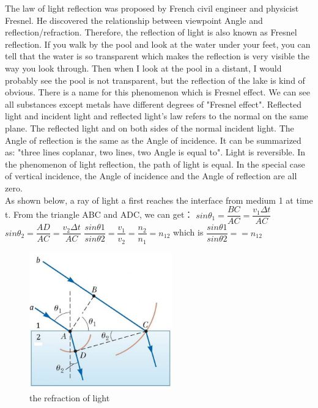 \documentclass[a4paper]{article}
\begin{document}
The law of light reflection was proposed by French civil engineer and physicist Fresnel. He discovered the relationship between viewpoint Angle and reflection/refraction. Therefore, the reflection of light is also known as Fresnel reflection. If you walk by the pool and look at the water under your feet, you can tell that the water is so transparent which makes the reflection is very visible the way you look through. Then when I look at the pool in a distant, I would probably see the pool is not transparent, but the reflection of the lake is kind of obvious. There is a name for this phenomenon which is Fresnel effect. We can see all substances except metals have different degrees of "Fresnel effect". Reflected light and incident light and reflected light's law refers to the normal on the same plane. The reflected light and on both sides of the normal incident light. The Angle of reflection is the same as the Angle of incidence. It can be summarized as: "three lines coplanar, two lines, two Angle is equal to". Light is reversible. In the phenomenon of light reflection, the path of light is equal. In the special case of vertical incidence, the Angle of incidence and the Angle of reflection are all zero.
\\

As shown below, a ray of light a first reaches the interface from medium 1 at time t.
From the triangle ABC and ADC, we can get：
$sin\theta _{1}= \dfrac{BC}{AC}= \dfrac{v_{1}\Delta t}{AC}$
$sin\theta _{2}= \dfrac{AD}{AC}= \dfrac{v_{2}\Delta t}{AC}$
$\dfrac{sin\theta 1}{sin\theta 2}= \dfrac{v_{1}}{v_{2}}= \dfrac{n_{2}}{n_{1}}= n_{12}$
which is
$\dfrac{sin\theta 1}{sin\theta 2}= = n_{12}$
\cite{Tarja Volotinen}
\\

\begin{figure}[h]
	\includegraphics[width=0.55\textwidth]{4.png}
	\caption{the refraction of light}
\end{figure}
\end{document}

